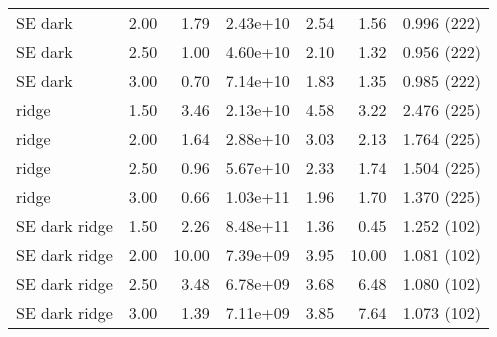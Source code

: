 \documentclass[preprint2,tighten,trackchanges]{aastex6}
\begin{document}
\begin{table*}
\begin{tabular}{@{}lrrrrrr@{}}
        SE dark & 2.00 & 1.79 & 2.43e+10 & 2.54 & 1.56 & 0.996 (222) \\  %
        SE dark & 2.50 & 1.00 & 4.60e+10 & 2.10 & 1.32 & 0.956 (222) \\  %
        SE dark & 3.00 & 0.70 & 7.14e+10 & 1.83 & 1.35 & 0.985 (222) \\  %
        \midrule
        ridge & 1.50 & 3.46 & 2.13e+10 & 4.58 & 3.22 & 2.476 (225) \\  %
        ridge & 2.00 & 1.64 & 2.88e+10 & 3.03 & 2.13 & 1.764 (225) \\  %
        ridge & 2.50 & 0.96 & 5.67e+10 & 2.33 & 1.74 & 1.504 (225) \\  %
        ridge & 3.00 & 0.66 & 1.03e+11 & 1.96 & 1.70 & 1.370 (225) \\  %
        \midrule
        SE dark ridge & 1.50 & 2.26 & 8.48e+11 & 1.36 & 0.45 & 1.252 (102) \\  %
        SE dark ridge & 2.00 & 10.00 & 7.39e+09 & 3.95 & 10.00 & 1.081 (102) \\  %
        SE dark ridge & 2.50 & 3.48 & 6.78e+09 & 3.68 & 6.48 & 1.080 (102) \\  %
        SE dark ridge & 3.00 & 1.39 & 7.11e+09 & 3.85 & 7.64 & 1.073 (102) \\  %
        \bottomrule
    \end{tabular}
\end{table*}
\end{document}
